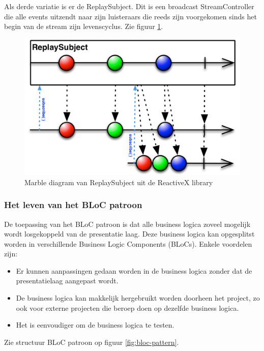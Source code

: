 Als derde variatie is er de ReplaySubject. Dit is een broadcast StreamController die alle events uitzendt naar zijn luisteraars die reeds zijn voorgekomen sinds het begin van de stream zijn levenscyclus. Zie figuur \ref{fig:rxdart-replaysubject}.

\begin{figure}[H]
    \centering
    \includegraphics[width=\figureWidthModifier\linewidth]{img/stand-van-zaken/rxdart-replaysubject.png}
    \caption{Marble diagram van ReplaySubject uit de ReactiveX library\autocite{Boelens2018}}
    \label{fig:rxdart-replaysubject}
\end{figure}

\subsubsection{Het leven van het BLoC patroon}
De toepassing van het BLoC patroon is dat alle business logica zoveel mogelijk wordt losgekoppeld van de presentatie laag. Deze business logica kan opgesplitst worden in verschillende Business Logic Components (BLoCs). 
\newline
Enkele voordelen zijn: 
\begin{itemize}
    \item Er kunnen aanpassingen gedaan worden in de business logica zonder dat de presentatielaag aangepast wordt.
    \item De business logica kan makkelijk hergebruikt worden doorheen het project, zo ook voor externe projecten die beroep doen op dezelfde business logica.
    \item Het is eenvoudiger om de business logica te testen.
\end{itemize}
Zie structuur BLoC patroon op figuur \ref{fig:bloc-pattern}.

